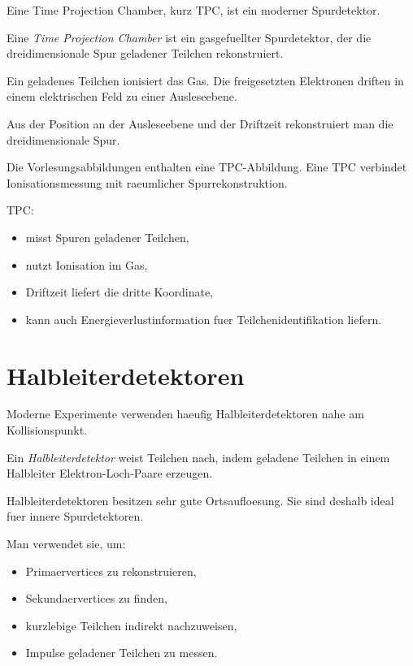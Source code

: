 Eine Time Projection Chamber, kurz TPC, ist ein moderner Spurdetektor.

\begin{definitionbox}
Eine \emph{Time Projection Chamber} ist ein gasgefuellter Spurdetektor, der die
dreidimensionale Spur geladener Teilchen rekonstruiert.
\end{definitionbox}

\begin{conceptbox}
Ein geladenes Teilchen ionisiert das Gas.
Die freigesetzten Elektronen driften in einem elektrischen Feld zu einer Ausleseebene.

Aus der Position an der Ausleseebene und der Driftzeit rekonstruiert man die
dreidimensionale Spur.
\end{conceptbox}

\begin{notebox}
Die Vorlesungsabbildungen enthalten eine TPC-Abbildung.
Eine TPC verbindet Ionisationsmessung mit raeumlicher Spurrekonstruktion.
\end{notebox}

\begin{examtipbox}
TPC:
\begin{itemize}
    \item misst Spuren geladener Teilchen,
    \item nutzt Ionisation im Gas,
    \item Driftzeit liefert die dritte Koordinate,
    \item kann auch Energieverlustinformation fuer Teilchenidentifikation liefern.
\end{itemize}
\end{examtipbox}

\section{Halbleiterdetektoren}

Moderne Experimente verwenden haeufig Halbleiterdetektoren nahe am Kollisionspunkt.

\begin{definitionbox}
Ein \emph{Halbleiterdetektor} weist Teilchen nach, indem geladene Teilchen in einem
Halbleiter Elektron-Loch-Paare erzeugen.
\end{definitionbox}

\begin{conceptbox}
Halbleiterdetektoren besitzen sehr gute Ortsaufloesung.
Sie sind deshalb ideal fuer innere Spurdetektoren.

Man verwendet sie, um:
\begin{itemize}
    \item Primaervertices zu rekonstruieren,
    \item Sekundaervertices zu finden,
    \item kurzlebige Teilchen indirekt nachzuweisen,
    \item Impulse geladener Teilchen zu messen.
\end{itemize}
\end{conceptbox}


